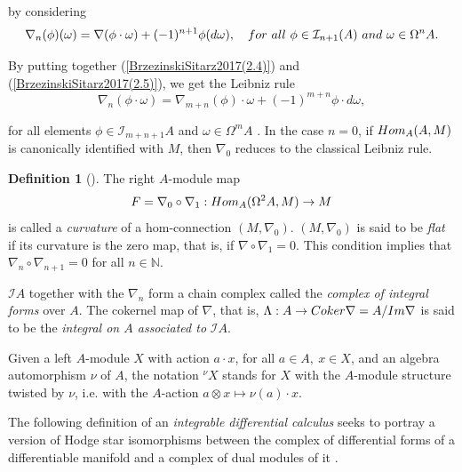 \documentclass{amsart}
\theoremstyle{definition}
\newtheorem{definition}[theorem]{Definition}
\theoremstyle{remark}
\numberwithin{equation}{section}
\begin{document}
by considering
\begin{equation}\label{BrzezinskiSitarz2017(2.5)}
\nabla_n(\phi)(\omega) = \nabla(\phi \cdot \omega) + (-1)^{n+1} \phi(d \omega), \quad {\rm for\ all}\ \phi \in \mathcal{I}_{n+1}(A)\ {\rm and} \ \omega \in \Omega^n A.
\end{equation}

By putting together (\ref{BrzezinskiSitarz2017(2.4)}) and (\ref{BrzezinskiSitarz2017(2.5)}), we get the Leibniz rule 
\begin{equation}
    \nabla_n(\phi \cdot \omega) = \nabla_{m + n}(\phi) \cdot \omega + (-1)^{m + n} \phi \cdot d\omega,
\end{equation}

for all elements $\phi \in \mathcal{I}_{m + n + 1} A$ and $\omega \in \Omega^m A$ \cite[Lemma 3.2]{Brzezinski2008}. In the case $n = 0$, if ${\rm Hom}_A(A, M)$ is canonically identified with $M$, then $\nabla_0$ reduces to the classical Leibniz rule.

\begin{definition}[{\cite[Definition 3.4]{Brzezinski2008}}]
The right $A$-module map 
$$
F = \nabla_0 \circ \nabla_1: {\rm Hom}_A(\Omega^{2} A, M) \to M
$$ is called a {\em curvature} of a hom-connection $(M, \nabla_0)$. $(M, \nabla_0)$ is said to be {\em flat} if its curvature is the zero map, that is, if $\nabla \circ \nabla_1 = 0$. This condition implies that $\nabla_n \circ \nabla_{n+1} = 0$ for all $n\in \mathbb{N}$.
\end{definition}

$\mathcal{I} A$ together with the $\nabla_n$ form a chain complex called the {\em complex of integral forms} over $A$. The cokernel map of $\nabla$, that is, $\Lambda: A \to {\rm Coker} \nabla = A / {\rm Im} \nabla$ is said to be the {\em integral on $A$ associated to} $\mathcal{I}A$.

Given a left $A$-module $X$ with action $a\cdot x$, for all $a\in A,\ x \in X$, and an algebra automorphism $\nu$ of $A$, the notation $^{\nu}X$ stands for $X$ with the $A$-module structure twisted by $\nu$, i.e. with the $A$-action $a\otimes x \mapsto \nu(a)\cdot x $.

The following definition of an \textit{integrable differential calculus} seeks to portray a version of Hodge star isomorphisms between the complex of differential forms of a differentiable manifold and a complex of dual modules of it \cite[p. 112]{Brzezinski2015}. 
\end{document}
